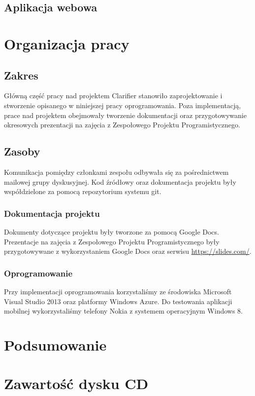 \documentclass{pracamgr}
\begin{document}
\section{Aplikacja webowa}

\chapter{Organizacja pracy}\label{r:org}

\section{Zakres}
Główną część pracy nad projektem Clarifier stanowiło zaprojektowanie i stworzenie opisanego w niniejszej pracy oprogramowania. Poza implementacją, prace nad projektem obejmowały tworzenie dokumentacji oraz przygotowywanie okresowych prezentacji na zajęcia z Zespołowego Projektu Programistycznego. 

\section{Zasoby}
Komunikacja pomiędzy członkami zespołu odbywała się za pośrednictwem mailowej grupy dyskusyjnej. Kod źródłowy oraz dokumentacja projektu były współdzielone za pomocą repozytorium systemu git.

\subsection{Dokumentacja projektu}
Dokumenty dotyczące projektu były tworzone za pomocą Google Docs. Prezentacje na zajęcia z Zespołowego Projektu Programistycznego były przygotowywane z wykorzystaniem Google Docs oraz serwisu \url{https://slides.com/}.

\subsection{Oprogramowanie}
Przy implementacji oprogramowania korzystaliśmy ze środowiska Microsoft Visual Studio 2013 oraz platformy Windows Azure. Do testowania aplikacji mobilnej wykorzystaliśmy telefony Nokia z systemem operacyjnym Windows 8.

\chapter{Podsumowanie}

\appendix

\chapter{Zawartość dysku CD}
\end{document}
